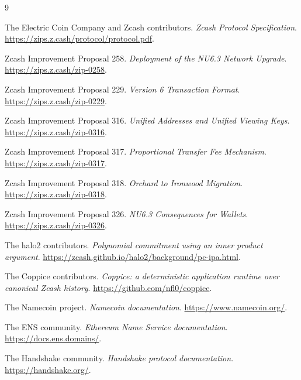 \documentclass[11pt]{article}
\begin{document}
\begin{thebibliography}{9}

The Electric Coin Company and Zcash contributors.
\newblock \emph{Zcash Protocol Specification}.
\newblock \url{https://zips.z.cash/protocol/protocol.pdf}.

Zcash Improvement Proposal 258.
\newblock \emph{Deployment of the NU6.3 Network Upgrade}.
\newblock \url{https://zips.z.cash/zip-0258}.

Zcash Improvement Proposal 229.
\newblock \emph{Version 6 Transaction Format}.
\newblock \url{https://zips.z.cash/zip-0229}.

Zcash Improvement Proposal 316.
\newblock \emph{Unified Addresses and Unified Viewing Keys}.
\newblock \url{https://zips.z.cash/zip-0316}.

Zcash Improvement Proposal 317.
\newblock \emph{Proportional Transfer Fee Mechanism}.
\newblock \url{https://zips.z.cash/zip-0317}.

Zcash Improvement Proposal 318.
\newblock \emph{Orchard to Ironwood Migration}.
\newblock \url{https://zips.z.cash/zip-0318}.

Zcash Improvement Proposal 326.
\newblock \emph{NU6.3 Consequences for Wallets}.
\newblock \url{https://zips.z.cash/zip-0326}.

The halo2 contributors.
\newblock \emph{Polynomial commitment using an inner product argument}.
\newblock \url{https://zcash.github.io/halo2/background/pc-ipa.html}.

The Coppice contributors.
\newblock \emph{Coppice: a deterministic application runtime over canonical
Zcash history}.
\newblock \url{https://github.com/nfl0/coppice}.

The Namecoin project.
\newblock \emph{Namecoin documentation}.
\newblock \url{https://www.namecoin.org/}.

The ENS community.
\newblock \emph{Ethereum Name Service documentation}.
\newblock \url{https://docs.ens.domains/}.

The Handshake community.
\newblock \emph{Handshake protocol documentation}.
\newblock \url{https://handshake.org/}.

\end{thebibliography}
\end{document}

